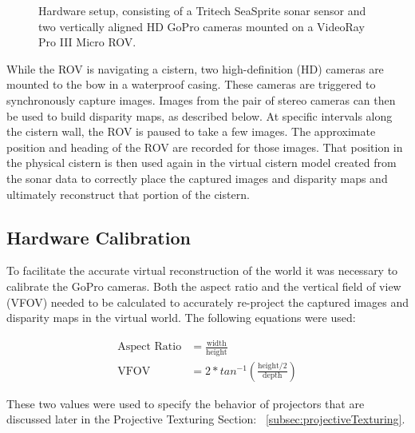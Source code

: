 \documentclass[a4paper,twoside]{article}
\begin{document}
\begin{figure}[!h]
   \vspace{-0.2cm}
   \caption{Hardware setup, consisting of a Tritech SeaSprite sonar sensor and two vertically aligned HD GoPro cameras mounted on a VideoRay Pro III Micro ROV.}
  \label{fig:ROV}
 \end{figure}

While the ROV is navigating a cistern, two high-definition (HD) cameras are mounted to the bow in a waterproof casing.
These cameras are triggered to synchronously capture images.  
Images from the pair of stereo cameras can then be used to build disparity maps, as described below.  
At specific intervals along the cistern wall, the ROV is paused to take a few images.  
The approximate position and heading of the ROV are recorded for those images.  
That position in the physical cistern is then used again in the virtual cistern model created from the sonar data to correctly place the captured images and disparity maps and ultimately reconstruct that portion of the cistern. 


\subsection{Hardware Calibration}
To facilitate the accurate virtual reconstruction of the world it was necessary to calibrate the GoPro cameras.
  Both the aspect ratio and the vertical field of view (VFOV) needed to be calculated to accurately re-project the captured images and disparity maps in the virtual world.  
The following equations were used:

\begin{align}
\text{Aspect Ratio} &= \frac{\text{width}}{\text{height}} \\
\text{VFOV} &= 2 * tan^{-1}(\frac{\text{height}/2}{\text{depth}})
\end{align}


These two values were used to specify the behavior of projectors that are discussed later in the Projective Texturing Section: ~\ref{subsec:projectiveTexturing}.
\end{document}
